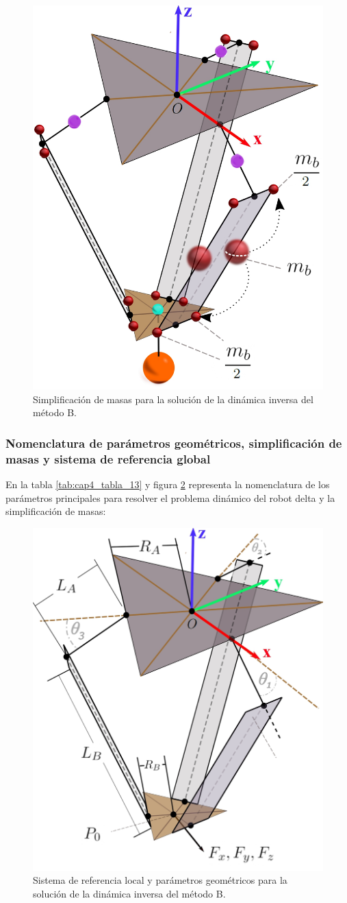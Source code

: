         \begin{figure}[H]
              \centering
	          \includegraphics[width=0.5\linewidth]{Main/Chapter4/Images4/DIBUJO39.jpg}
              \caption{Simplificación de masas para la solución de la dinámica inversa del método B.}
              \label{f:Cap4_Metodo_B_Modelacion_Dinamica_1}
        \end{figure}
        
                \newpage


        \subsubsection{Nomenclatura de parámetros geométricos, simplificación de masas y sistema de referencia global }

        En la tabla \ref{tab:cap4_tabla_13} y figura \ref{f:Cap4_Metodo_B_Modelacion_Dinamica_2} representa la nomenclatura de los parámetros principales para resolver el problema dinámico del robot delta y la simplificación de masas:
        
        \begin{figure}[H]
              \centering
	          \includegraphics[width=0.55\linewidth]{Main/Chapter4/Images4/DIBUJO36.jpg}
              \caption{Sistema de referencia local y parámetros geométricos para la solución
de la dinámica inversa del método B.}
              \label{f:Cap4_Metodo_B_Modelacion_Dinamica_2}
        \end{figure}

